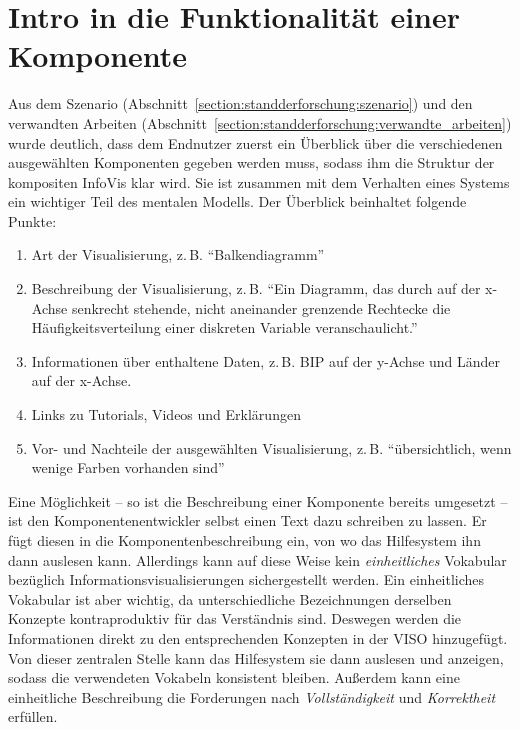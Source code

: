 \documentclass[
	headsepline,
	footsepline,
	fontsize=12pt,
	bibliography=totoc
]{scrbook}
\begin{document}
\section{Intro in die Funktionalität einer Komponente}
\label{section:konzeption:intro}

Aus dem Szenario (Abschnitt~\ref{section:standderforschung:szenario}) und den verwandten Arbeiten (Abschnitt~\ref{section:standderforschung:verwandte_arbeiten}) wurde deutlich, dass dem Endnutzer zuerst ein Überblick über die verschiedenen ausgewählten Komponenten gegeben werden muss, sodass ihm die Struktur der kompositen InfoVis klar wird. Sie ist zusammen mit dem Verhalten eines Systems ein wichtiger Teil des mentalen Modells. Der Überblick beinhaltet folgende Punkte:


\begin{enumerate}
	\item Art der Visualisierung, z.\,B. \enquote{Balkendiagramm}
	\item Beschreibung der Visualisierung, z.\,B. \enquote{Ein Diagramm, das durch auf der x-Achse senkrecht stehende, nicht aneinander grenzende Rechtecke die Häufigkeitsverteilung einer diskreten Variable veranschaulicht.}
	\item Informationen über enthaltene Daten, z.\,B. BIP auf der y-Achse und Länder auf der x-Achse.
	\item Links zu Tutorials, Videos und Erklärungen
	\item Vor- und Nachteile der ausgewählten Visualisierung, z.\,B. \enquote{übersichtlich, wenn wenige Farben vorhanden sind}
\end{enumerate}

Eine Möglichkeit -- so ist die Beschreibung einer Komponente bereits umgesetzt -- ist den Komponentenentwickler selbst einen Text dazu schreiben zu lassen. Er fügt diesen in die Komponentenbeschreibung ein, von wo das Hilfesystem ihn dann auslesen kann. Allerdings kann auf diese Weise kein \emph{einheitliches} Vokabular bezüglich Informationsvisualisierungen sichergestellt werden. Ein einheitliches Vokabular ist aber wichtig, da unterschiedliche Bezeichnungen derselben Konzepte kontraproduktiv für das Verständnis sind. Deswegen werden die Informationen direkt zu den entsprechenden Konzepten in der VISO hinzugefügt. Von dieser zentralen Stelle kann das Hilfesystem sie dann auslesen und anzeigen, sodass die verwendeten Vokabeln konsistent bleiben. Außerdem kann eine einheitliche Beschreibung die Forderungen nach \emph{Vollständigkeit} und \emph{Korrektheit} erfüllen.
\end{document}
